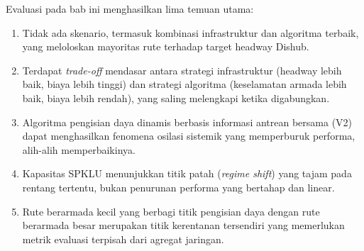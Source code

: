 Evaluasi pada bab ini menghasilkan lima temuan utama:
\begin{enumerate}
	\item Tidak ada skenario, termasuk kombinasi infrastruktur dan algoritma
	terbaik, yang meloloskan mayoritas rute terhadap target headway Dishub.
	\item Terdapat \textit{trade-off} mendasar antara strategi infrastruktur
	(headway lebih baik, biaya lebih tinggi) dan strategi algoritma
	(keselamatan armada lebih baik, biaya lebih rendah), yang saling
	melengkapi ketika digabungkan.
	\item Algoritma pengisian daya dinamis berbasis informasi antrean
	bersama (V2) dapat menghasilkan fenomena osilasi sistemik yang
	memperburuk performa, alih-alih memperbaikinya.
	\item Kapasitas SPKLU menunjukkan titik patah (\textit{regime shift})
	yang tajam pada rentang tertentu, bukan penurunan performa yang
	bertahap dan linear.
	\item Rute berarmada kecil yang berbagi titik pengisian daya dengan rute
	berarmada besar merupakan titik kerentanan tersendiri yang memerlukan
	metrik evaluasi terpisah dari agregat jaringan.
\end{enumerate}